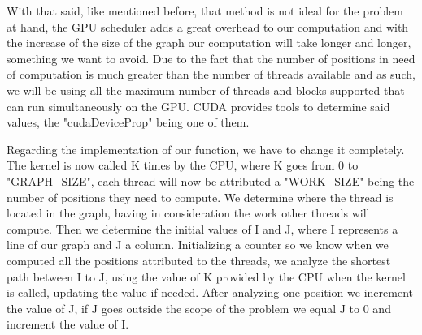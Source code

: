 \documentclass[conference]{IEEEtran}
\begin{document}
With that said, like mentioned before, that method is not ideal for the problem at hand, the GPU scheduler adds a great overhead to our computation and with the increase of the size of the graph our computation will take longer and longer, something we want to avoid. Due to the fact that the number of positions in need of computation is much greater than the number of threads available and as such, we will be using all the maximum number of threads and blocks supported that can run simultaneously on the GPU. 
CUDA provides tools to determine said values, the "cudaDeviceProp" being one of them.

Regarding the implementation of our function, we have to change it completely.
The kernel is now called K times by the CPU, where K goes from 0 to "GRAPH\_SIZE", 
each thread will now be attributed a "WORK\_SIZE" being the number of positions they need to compute. 
We determine where the thread is located in the graph, having in consideration the work other threads will compute. Then we determine the initial values of I and J, where I represents a line of our graph and J a column. Initializing a counter so we know when we computed all the positions attributed to the threads, we analyze the shortest path between I to J, using the value of K provided by the CPU when the kernel is called, updating the value if needed. After analyzing one position we increment the value of J, if J goes outside the scope of the problem we equal J to 0 and increment the value of I.
\end{document}
